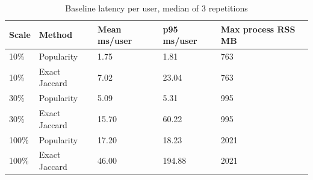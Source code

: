 \begin{table}[ht]\centering
\caption{Baseline latency per user, median of 3 repetitions}
\begin{tabular}{lllll}
\hline
Scale & Method & Mean ms/user & p95 ms/user & Max process RSS MB \\
\hline
10\% & Popularity & 1.75 & 1.81 & 763 \\
10\% & Exact Jaccard & 7.02 & 23.04 & 763 \\
30\% & Popularity & 5.09 & 5.31 & 995 \\
30\% & Exact Jaccard & 15.70 & 60.22 & 995 \\
100\% & Popularity & 17.20 & 18.23 & 2021 \\
100\% & Exact Jaccard & 46.00 & 194.88 & 2021 \\
\hline
\end{tabular}
\end{table}

